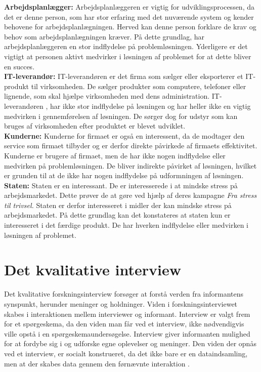 \textbf{Arbejdsplanlægger:}
Arbejdsplanlæggeren er vigtig for udviklingsprocessen, da det er denne person, som har stor erfaring med det nuværende system og kender behovene for arbejdsplanlægningen. Herved kan denne person forklare de krav og behov som arbejdsplanlægningen kræver. På dette grundlag, har arbejdsplanlæggeren en stor indflydelse på problemløsningen. Yderligere er det vigtigt at personen aktivt medvirker i løsningen af problemet for at dette bliver en succes. \\

\textbf{IT-leverandør:}
IT-leverandøren er det firma som sælger eller eksporterer et IT-produkt til virksomheden. De sælger produkter som computere, telefoner eller lignende, som skal hjælpe virksomheden med dens administration.
IT-leverandøren , har ikke stor indflydelse på løsningen og har heller ikke en vigtig medvirken i gennemførelsen af løsningen. De sørger dog for udstyr som kan bruges af virksomheden efter produktet er blevet udviklet.\\

\textbf{Kunderne:}
Kunderne for firmaet er også en interessent, da de modtager den service som firmaet tilbyder og er derfor direkte påvirkede af firmaets effektivitet. Kunderne er brugere af firmaet, men de har ikke nogen indflydelse eller medvirken på problemløsningen. De bliver indirekte påvirket af løsningen, hvilket er grunden til at de ikke har nogen indflydelse på udformningen af løsningen.\\

\textbf{Staten:}
Staten er en interessant. De er interesserede i at mindske stress på arbejdsmarkedet. Dette prøver de at gøre ved hjælp af deres kampagne \textit{Fra stress til trivsel\citep{Arbejdsmiljoe_Arbejdspladser}.} Staten er derfor interesseret i midler der kan mindske stress på arbejdsmarkedet. På dette grundlag kan det konstateres at staten kun er interesseret i det færdige produkt. De har hverken indflydelse eller medvirken i løsningen af problemet.

\section{Det kvalitative interview}
Det kvalitative forskningsinterview forsøger at forstå verden fra informantens synspunkt, herunder meninger og holdninger. Viden i forskningsinterviewet skabes i interaktionen mellem interviewer og informant. Interview er valgt frem for et spørgeskema, da den viden man får ved et interview, ikke nødvendigvis ville opstå i en spørgeskemaundersøgelse. Interview giver informanten mulighed for at fordybe sig i og udforske egne oplevelser og meninger. Den viden der opnås ved et interview, er socialt konstrueret, da det ikke bare er en dataindsamling, men at der skabes data gennem den førnævnte interaktion \citep{kvale2009}.\\

